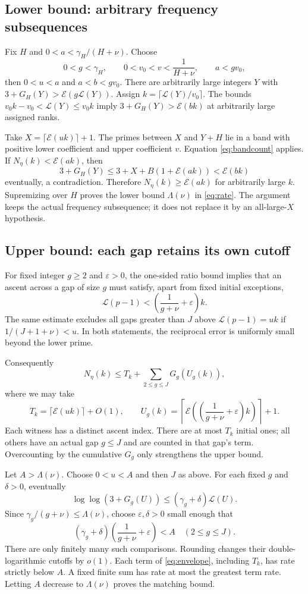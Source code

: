 \documentclass[11pt]{article}
\theoremstyle{definition}
\newcommand{\LL}{\mathcal L}
\newcommand{\EE}{\mathcal E}
\begin{document}
\subsection{Lower bound: arbitrary frequency subsequences}
Fix $H$ and $0<a<\gamma_H/(H+\nu)$. Choose
\[
 0<g<\gamma_H,\qquad
 0<v_0<v<\frac1{H+\nu},\qquad a<gv_0,
\]
then $0<u<a$ and $a<b<gv_0$.
There are arbitrarily large integers $Y$ with
$3+G_H(Y)>\EE(g\LL(Y))$. Assign
$k=\lceil\LL(Y)/v_0\rceil$. The bounds
$v_0k-v_0<\LL(Y)\le v_0k$ imply
$3+G_H(Y)>\EE(bk)$ at arbitrarily large assigned ranks.

Take $X=\lceil\EE(uk)\rceil+1$. The primes between $X$ and
$Y+H$ lie in a band with positive lower coefficient and upper
coefficient $v$. Equation \eqref{eq:bandcount} applies.
If $N_\eta(k)<\EE(ak)$, then
\[
 3+G_H(Y)\le3+X+B(1+\EE(ak))<\EE(bk)
\]
eventually, a contradiction. Therefore $N_\eta(k)\ge\EE(ak)$
for arbitrarily large $k$. Supremizing over $H$ proves the lower
bound $\Lambda(\nu)$ in \eqref{eq:rate}.
The argument keeps the actual frequency subsequence; it does not
replace it by an all-large-$X$ hypothesis.

\subsection{Upper bound: each gap retains its own cutoff}
For fixed integer $g\ge2$ and $\varepsilon>0$, the one-sided
ratio bound implies that an ascent across a gap of size $g$
must satisfy, apart from fixed initial exceptions,
\begin{equation}\label{eq:cutoff}
 \LL(p-1)<\left(\frac1{g+\nu}+\varepsilon\right)k.
\end{equation}
The same estimate excludes all gaps greater than $J$ above
$\LL(p-1)=uk$ if $1/(J+1+\nu)<u$.
In both statements, the reciprocal error is uniformly small
beyond the lower prime.

Consequently
\begin{equation}\label{eq:envelope}
 N_\eta(k)\le T_k+\sum_{2\le g\le J}G_g(U_g(k)),
\end{equation}
where we may take
\[
 T_k=\lceil\EE(uk)\rceil+O(1),\qquad
 U_g(k)=\left\lceil\EE\left(
       \left(\frac1{g+\nu}+\varepsilon\right)k\right)\right\rceil+1.
\]
Each witness has a distinct ascent index. There are at most $T_k$
initial ones; all others have an actual gap $g\le J$ and are
counted in that gap's term. Overcounting by the cumulative
$G_g$ only strengthens the upper bound.

Let $A>\Lambda(\nu)$. Choose $0<u<A$ and then $J$ as above.
For each fixed $g$ and $\delta>0$, eventually
\[
 \log\log(3+G_g(U))\le(\gamma_g+\delta)\LL(U).
\]
Since $\gamma_g/(g+\nu)\le\Lambda(\nu)$, choose
$\varepsilon,\delta>0$ small enough that
\[
 (\gamma_g+\delta)
       \left(\frac1{g+\nu}+\varepsilon\right)<A
       \quad(2\le g\le J).
\]
There are only finitely many such comparisons. Rounding changes
their double-logarithmic cutoffs by $o(1)$. Each term of
\eqref{eq:envelope}, including $T_k$, has rate strictly below $A$.
A fixed finite sum has rate at most the greatest term rate.
Letting $A$ decrease to $\Lambda(\nu)$ proves the matching bound.
\end{document}
